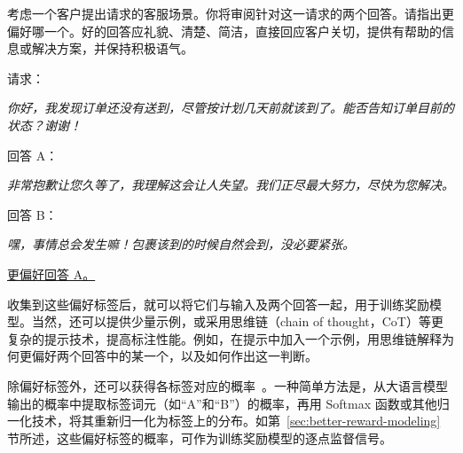 \vspace{0.5em}
\begin{tcolorbox}

\begingroup
\setlength{\leftskip}{2em}
\setlength{\rightskip}{2em}

考虑一个客户提出请求的客服场景。你将审阅针对这一请求的两个回答。请指出更偏好哪一个。好的回答应礼貌、清楚、简洁，直接回应客户关切，提供有帮助的信息或解决方案，并保持积极语气。

\vspace{0.3cm}

请求：

\vspace{0.1cm}

\textit{你好，我发现订单还没有送到，尽管按计划几天前就该到了。能否告知订单目前的状态？谢谢！}

\vspace{0.2cm}

回答 A：

\vspace{0.1cm}

\textit{非常抱歉让您久等了，我理解这会让人失望。我们正尽最大努力，尽快为您解决。}

\vspace{0.3cm}

回答 B：

\vspace{0.1cm}

\textit{嘿，事情总会发生嘛！包裹该到的时候自然会到，没必要紧张。}

\vspace{0.3cm}

\underline{更偏好回答 A。}

\endgroup

\end{tcolorbox}
\vspace{0.5em}

收集到这些偏好标签后，就可以将它们与输入及两个回答一起，用于训练奖励模型。当然，还可以提供少量示例，或采用思维链（chain of thought，CoT）等更复杂的提示技术，提高标注性能。例如，在提示中加入一个示例，用思维链解释为何更偏好两个回答中的某一个，以及如何作出这一判断。

除偏好标签外，还可以获得各标签对应的概率~\cite{lee-etal:2023rlaif}。一种简单方法是，从大语言模型输出的概率中提取标签词元（如“A”和“B”）的概率，再用 Softmax 函数或其他归一化技术，将其重新归一化为标签上的分布。如第~\ref{sec:better-reward-modeling} 节所述，这些偏好标签的概率，可作为训练奖励模型的逐点监督信号。


